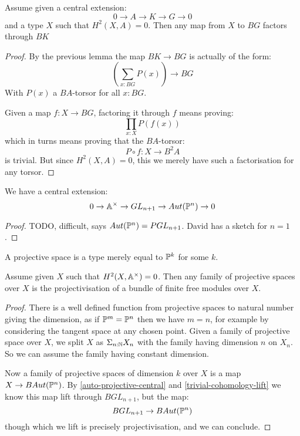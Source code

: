 \begin{lemma}\label{trivial-cohomology-lift}
Assume given a central extension:
\[0 \to A \to K \to G \to 0\]
and a type $X$ such that $H^2(X,A)=0$. Then any map from $X$ to $BG$ factors through $BK$
\end{lemma}

\begin{proof}
By the previous lemma the map $BK\to BG$ is actually of the form:
\[\left(\sum_{x:BG} P(x)\right) \to BG\]
With $P(x)$ a $BA$-torsor for all $x:BG$. 

Given a map $f:X\to BG$, factoring it through $f$ means proving:
\[\prod_{x:X} P(f(x))\]
which in turns means proving that the $BA$-torsor:
\[P\circ f: X\to B^2A\]
is trivial. But since $H^2(X,A)=0$, this we merely have such a factorisation for any torsor.
\end{proof}

\begin{proposition}\label{auto-projective-central}
We have a central extension:
\[0 \to \mathbb{A}^\times \to GL_{n+1} \to Aut(\mathbb{P}^n) \to 0\]
\end{proposition}

\begin{proof}
TODO, difficult, says $Aut(\mathbb{P}^n) = PGL_{n+1}$. David has a sketch for $n=1$.
\end{proof}

A projective space is a type merely equal to $\mathbb{P}^k$ for some $k$.

\begin{corollary}\label{projective-space-are-projectivisation-bundle}
Assume given $X$ such that $H^2(X,\mathbb{A}^\times) = 0$. Then any family of projective spaces over $X$ is the projectivisation of a bundle of finite free modules over $X$.
\end{corollary}

\begin{proof}
There is a well defined function from projective spaces to natural number giving the dimension, as if $\mathbb{P}^m = \mathbb{P}^n$ then we have $m=n$, for example by considering the tangent space at any chosen point. Given a family of projective space over $X$, we split $X$ as $\Sigma_{n:\mathbb{N}}X_n$ with the family having dimension $n$ on $X_n$. So we can assume the family having constant dimension.

Now a family of projective spaces of dimension $k$ over $X$ is a map $X\to BAut(\mathbb{P}^n)$. By \cref{auto-projective-central} and \cref{trivial-cohomology-lift} we know this map lift through $BGL_{n+1}$, but the map:
\[BGL_{n+1} \to BAut(\mathbb{P}^n)\]
though which we lift is precisely projectivisation, and we can conclude.
\end{proof}

